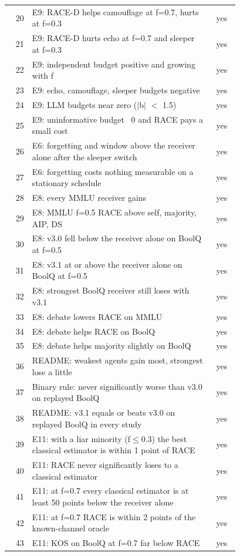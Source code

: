 \begin{longtable}{@{}r p{0.78\linewidth} c@{}}
20 & E9: RACE-D helps camouflage at f=0.7, hurts at f=0.3 & yes\\
21 & E9: RACE-D hurts echo at f=0.7 and sleeper at f=0.3 & yes\\
22 & E9: independent budget positive and growing with f & yes\\
23 & E9: echo, camouflage, sleeper budgets negative & yes\\
24 & E9: LLM budgets near zero ($|$b$|$ $<$ 1.5) & yes\\
25 & E9: uninformative budget ~0 and RACE pays a small cost & yes\\
26 & E6: forgetting and window above the receiver alone after the sleeper switch & yes\\
27 & E6: forgetting costs nothing measurable on a stationary schedule & yes\\
28 & E8: every MMLU receiver gains & yes\\
29 & E8: MMLU f=0.5 RACE above self, majority, AIP, DS & yes\\
30 & E8: v3.0 fell below the receiver alone on BoolQ at f=0.5 & yes\\
31 & E8: v3.1 at or above the receiver alone on BoolQ at f=0.5 & yes\\
32 & E8: strongest BoolQ receiver still loses with v3.1 & yes\\
33 & E8: debate lowers RACE on MMLU & yes\\
34 & E8: debate helps RACE on BoolQ & yes\\
35 & E8: debate helps majority slightly on BoolQ & yes\\
36 & README: weakest agents gain most, strongest lose a little & yes\\
37 & Binary rule: never significantly worse than v3.0 on replayed BoolQ & yes\\
38 & README: v3.1 equals or beats v3.0 on replayed BoolQ in every study & yes\\
39 & E11: with a liar minority (f$\le$0.3) the best classical estimator is within 1 point of RACE & yes\\
40 & E11: RACE never significantly loses to a classical estimator & yes\\
41 & E11: at f=0.7 every classical estimator is at least 50 points below the receiver alone & yes\\
42 & E11: at f=0.7 RACE is within 2 points of the known-channel oracle & yes\\
43 & E11: KOS on BoolQ at f=0.7 far below RACE & yes\\
\bottomrule
\end{longtable}
